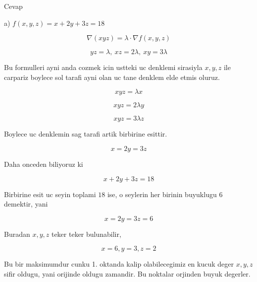 \documentclass[12pt,fleqn]{article}\usepackage{../common}
\begin{document}
Cevap

a) $f(x,y,z) = x + 2y + 3z = 18$

\[ \nabla (xyz) = \lambda \cdot \nabla f(x,y,z) \]

\[ yz = \lambda, \ xz = 2\lambda, \ xy = 3\lambda \]

Bu formulleri ayni anda cozmek icin ustteki uc denklemi sirasiyla $x,y,z$
ile carpariz boylece sol tarafi ayni olan uc tane denklem elde etmis
oluruz. 

\[ xyz = \lambda x \]

\[ xyz = 2 \lambda y \]

\[ xyz = 3 \lambda z \]

Boylece uc denklemin sag tarafi artik birbirine esittir. 

\[ x = 2y = 3z \]

Daha onceden biliyoruz ki

\[ x + 2y + 3z = 18 \]

Birbirine esit uc seyin toplami $18$ ise, o seylerin her birinin buyuklugu
$6$ demektir, yani 

\[ x = 2y = 3z = 6\]

Buradan $x,y,z$ teker teker bulunabilir,

\[ x = 6, y=3, z= 2 \]

Bu bir maksimumdur cunku 1. oktanda kalip olabilecegimiz en kucuk deger
$x,y,z$ sifir oldugu, yani orijinde oldugu zamandir. Bu noktalar orjinden
buyuk degerler. 
\end{document}
